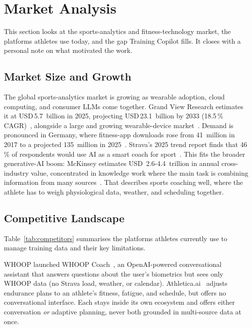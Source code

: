 \section{Market Analysis}\label{sec:market}

This section looks at the sports-analytics and fitness-technology market, the platforms athletes use today, and the gap Training Copilot fills. It closes with a personal note on what motivated the work.

\subsection{Market Size and Growth}\label{sec:market:size}

The global sports-analytics market is growing as wearable adoption, cloud computing, and consumer LLMs come together. Grand View Research estimates it at USD\,5.7~billion in 2025, projecting USD\,23.1~billion by 2033 (18.5\,\% CAGR)~\citep{grandview_sports_2024}, alongside a large and growing wearable-device market~\citep{idc_wearables_2024}. Demand is pronounced in Germany, where fitness-app downloads rose from 41~million in 2017 to a projected 135~million in 2025~\citep{statista_fitness_apps_2025}. Strava's 2025 trend report finds that 46\,\% of respondents would use AI as a smart coach for sport~\citep{strava_trends_2025}. This fits the broader generative-AI boom: McKinsey estimates USD~2.6-4.4~trillion in annual cross-industry value, concentrated in knowledge work where the main task is combining information from many sources~\citep{mckinsey_genai_2023}. That describes sports coaching well, where the athlete has to weigh physiological data, weather, and scheduling together.

\subsection{Competitive Landscape}\label{sec:market:landscape}

Table~\ref{tab:competitors} summarises the platforms athletes currently use to manage training data and their key limitations.



WHOOP launched WHOOP Coach~\citep{whoop_coach_2024}, an OpenAI-powered conversational assistant that answers questions about the user's biometrics but sees only WHOOP data (no Strava load, weather, or calendar). Athletica.ai~\citep{athletica_ai_2024} adjusts endurance plans to an athlete's fitness, fatigue, and schedule, but offers no conversational interface. Each stays inside its own ecosystem and offers either conversation \textit{or} adaptive planning, never both grounded in multi-source data at once.

